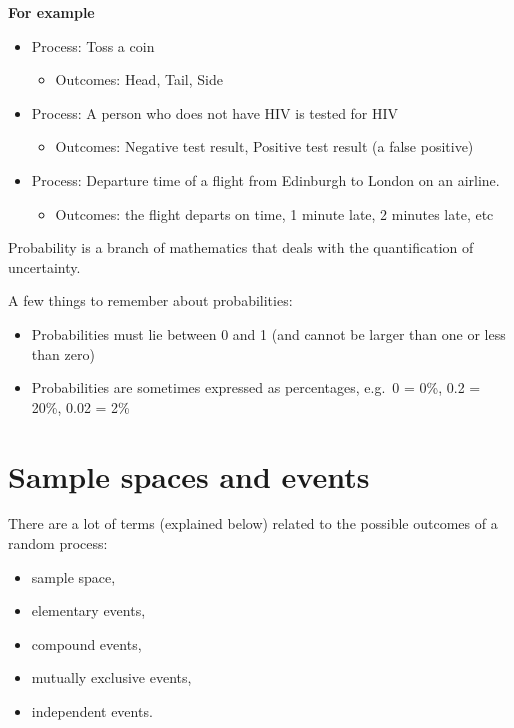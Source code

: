 \documentclass[
  oneside]{krantz}
\providecommand{\tightlist}{%
  \setlength{\itemsep}{0pt}\setlength{\parskip}{0pt}}
\begin{document}
\textbf{For example}

\begin{itemize}
\tightlist
\item
  Process: Toss a coin

  \begin{itemize}
  \tightlist
  \item
    Outcomes: Head, Tail, Side
  \end{itemize}
\item
  Process: A person who does not have HIV is tested for HIV

  \begin{itemize}
  \tightlist
  \item
    Outcomes: Negative test result, Positive test result (a false positive)
  \end{itemize}
\item
  Process: Departure time of a flight from Edinburgh to London on an airline.

  \begin{itemize}
  \tightlist
  \item
    Outcomes: the flight departs on time, 1 minute late, 2 minutes late, etc
  \end{itemize}
\end{itemize}

Probability is a branch of mathematics that deals with the quantification of uncertainty.

A few things to remember about probabilities:

\begin{itemize}
\tightlist
\item
  Probabilities must lie between 0 and 1 (and cannot be larger than one or less than zero)
\item
  Probabilities are sometimes expressed as percentages, e.g.~0 = 0\%, 0.2 = 20\%, 0.02 = 2\%
\end{itemize}

\hypertarget{sample-spaces-and-events}{%
\section{Sample spaces and events}\label{sample-spaces-and-events}}

There are a lot of terms (explained below) related to the possible outcomes of a random process:

\begin{itemize}
\tightlist
\item
  sample space,
\item
  elementary events,
\item
  compound events,
\item
  mutually exclusive events,
\item
  independent events.
\end{itemize}
\end{document}
